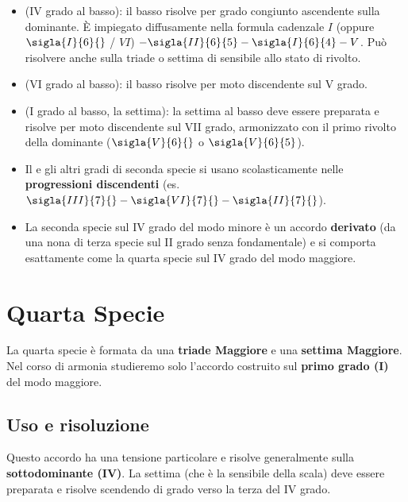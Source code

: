 \begin{itemize}
	\item \textbf{} (IV grado al basso): il basso risolve per grado congiunto ascendente sulla dominante. È impiegato diffusamente nella formula cadenzale $I$ (oppure $\sigla{I}{6}{}$ / $VI$) $- \sigla{II}{6}{5} - \sigla{I}{6}{4} - V$. Può risolvere anche sulla triade o settima di sensibile allo stato di rivolto.
	\item \textbf{} (VI grado al basso): il basso risolve per moto discendente sul V grado.
	\item \textbf{} (I grado al basso, la settima): la settima al basso deve essere preparata e risolve per moto discendente sul VII grado, armonizzato con il primo rivolto della dominante ($\sigla{V}{6}{}$ o $\sigla{V}{6}{5}$).
\end{itemize}

\begin{osservazione}
	\label{oss:ii7_progressioni}
	\begin{itemize}
		\item Il  e gli altri gradi di seconda specie si usano scolasticamente nelle \textbf{progressioni discendenti} (es. $\sigla{III}{7}{} - \sigla{VI}{7}{} - \sigla{II}{7}{}$).
		\item La seconda specie sul IV grado del modo minore è un accordo \textbf{derivato} (da una nona di terza specie sul II grado senza fondamentale) e si comporta esattamente come la quarta specie sul IV grado del modo maggiore.
	\end{itemize}
\end{osservazione}

\section{Quarta Specie}
\label{sec:quarta_specie_dettaglio}

La quarta specie è formata da una \textbf{triade Maggiore} e una \textbf{settima Maggiore}. Nel corso di armonia studieremo solo l'accordo costruito sul \textbf{primo grado (I)} del modo maggiore.

\subsection{Uso e risoluzione}
Questo accordo ha una tensione particolare e risolve generalmente sulla \textbf{sottodominante (IV)}. La settima (che è la sensibile della scala) deve essere preparata e risolve scendendo di grado verso la terza del IV grado.

